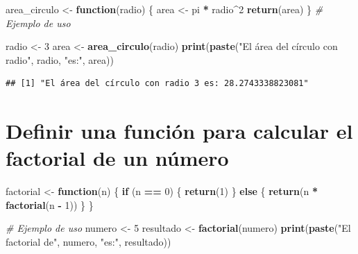 \documentclass[
]{book}
\newenvironment{Shaded}{\begin{snugshade}}{\end{snugshade}}
\newcommand{\CommentTok}[1]{\textcolor[rgb]{0.56,0.35,0.01}{\textit{#1}}}
\newcommand{\ControlFlowTok}[1]{\textcolor[rgb]{0.13,0.29,0.53}{\textbf{#1}}}
\newcommand{\DecValTok}[1]{\textcolor[rgb]{0.00,0.00,0.81}{#1}}
\newcommand{\FunctionTok}[1]{\textcolor[rgb]{0.13,0.29,0.53}{\textbf{#1}}}
\newcommand{\NormalTok}[1]{#1}
\newcommand{\OtherTok}[1]{\textcolor[rgb]{0.56,0.35,0.01}{#1}}
\newcommand{\SpecialCharTok}[1]{\textcolor[rgb]{0.81,0.36,0.00}{\textbf{#1}}}
\newcommand{\StringTok}[1]{\textcolor[rgb]{0.31,0.60,0.02}{#1}}
\begin{document}
\begin{Shaded}
\begin{Highlighting}[]
\NormalTok{area\_circulo }\OtherTok{\textless{}{-}} \ControlFlowTok{function}\NormalTok{(radio) \{}
\NormalTok{  area }\OtherTok{\textless{}{-}}\NormalTok{ pi }\SpecialCharTok{*}\NormalTok{ radio}\SpecialCharTok{\^{}}\DecValTok{2}
  \FunctionTok{return}\NormalTok{(area)}
\NormalTok{\}}
\CommentTok{\# Ejemplo de uso}

\NormalTok{radio }\OtherTok{\textless{}{-}} \DecValTok{3}
\NormalTok{area }\OtherTok{\textless{}{-}} \FunctionTok{area\_circulo}\NormalTok{(radio)}
\FunctionTok{print}\NormalTok{(}\FunctionTok{paste}\NormalTok{(}\StringTok{"El área del círculo con radio"}\NormalTok{, radio, }\StringTok{"es:"}\NormalTok{, area))}
\end{Highlighting}
\end{Shaded}

\begin{verbatim}
## [1] "El área del círculo con radio 3 es: 28.2743338823081"
\end{verbatim}

\hypertarget{definir-una-funciuxf3n-para-calcular-el-factorial-de-un-nuxfamero}{%
\section{Definir una función para calcular el factorial de un número}\label{definir-una-funciuxf3n-para-calcular-el-factorial-de-un-nuxfamero}}

\begin{Shaded}
\begin{Highlighting}[]
\NormalTok{factorial }\OtherTok{\textless{}{-}} \ControlFlowTok{function}\NormalTok{(n) \{}
  \ControlFlowTok{if}\NormalTok{ (n }\SpecialCharTok{==} \DecValTok{0}\NormalTok{) \{}
    \FunctionTok{return}\NormalTok{(}\DecValTok{1}\NormalTok{)}
\NormalTok{  \} }\ControlFlowTok{else}\NormalTok{ \{}
    \FunctionTok{return}\NormalTok{(n }\SpecialCharTok{*} \FunctionTok{factorial}\NormalTok{(n }\SpecialCharTok{{-}} \DecValTok{1}\NormalTok{))}
\NormalTok{  \}}
\NormalTok{\}}

\CommentTok{\# Ejemplo de uso}
\NormalTok{numero }\OtherTok{\textless{}{-}} \DecValTok{5}
\NormalTok{resultado }\OtherTok{\textless{}{-}} \FunctionTok{factorial}\NormalTok{(numero)}
\FunctionTok{print}\NormalTok{(}\FunctionTok{paste}\NormalTok{(}\StringTok{"El factorial de"}\NormalTok{, numero, }\StringTok{"es:"}\NormalTok{, resultado))}
\end{Highlighting}
\end{Shaded}
\end{document}
